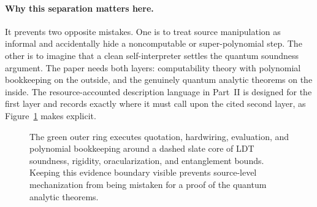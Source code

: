 \paragraph{Why this separation matters here.}
It prevents two opposite mistakes.  One is to treat source manipulation as
informal and accidentally hide a noncomputable or super-polynomial step.  The
other is to imagine that a clean self-interpreter settles the quantum
soundness argument.  The paper needs both layers: computability theory with
polynomial bookkeeping on the outside, and the genuinely quantum analytic
theorems on the inside.  The resource-accounted description language in
Part~II is designed for the first layer and records exactly where it must call
upon the cited second layer, as Figure~\ref{fig:two-layers} makes explicit.

\begin{figure}[t]
\centering

\caption{The green outer ring executes quotation, hardwiring, evaluation, and polynomial bookkeeping around a dashed slate core of LDT soundness, rigidity, oracularization, and entanglement bounds.  Keeping this evidence boundary visible prevents source-level mechanization from being mistaken for a proof of the quantum analytic theorems.}
\label{fig:two-layers}
\end{figure}
